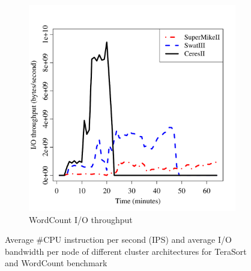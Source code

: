 \documentclass[journal]{IEEEtran}
\begin{document}
\begin{figure}[htb]
\begin{subfigure}[b]{0.24\textwidth}
                \includegraphics[width=\textwidth]{Figures/SystemFigures/WordCountIO.pdf}
                \caption{WordCount I/O throughput}
                \label{fig:WordCountIO}
   \end{subfigure}
   \caption{Average \#CPU instruction per second (IPS) and average I/O bandwidth per node of different cluster architectures for TeraSort and WordCount benchmark }
  \label{fig:IPS}
\end{figure}
\end{document}
